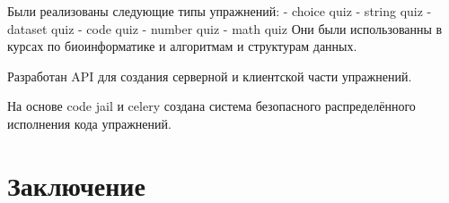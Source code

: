 \documentclass{matmex-diploma-custom}
\begin{document}
Были реализованы следующие типы упражнений:
- choice quiz
- string quiz
- dataset quiz
- code quiz
- number quiz
- math quiz
Они были использованны в курсах по биоинформатике
и алгоритмам и структурам данных.

Разработан API для создания серверной и клиентской части
упражнений.

На основе code jail и celery создана система безопасного
распределённого исполнения кода упражнений.


\section*{Заключение}



\end{document}
